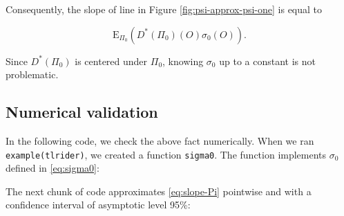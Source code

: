 \documentclass[
  11pt,
  openright,twoside]{book}
\newenvironment{Shaded}{\begin{snugshade}}{\end{snugshade}}
\newcommand{\CommentTok}[1]{\textcolor[rgb]{0.56,0.35,0.01}{\textit{#1}}}
\newcommand{\NormalTok}[1]{#1}
\newcommand{\Exp}{\textrm{E}}
\theoremstyle{definition}
\theoremstyle{definition}
\theoremstyle{definition}
\theoremstyle{definition}
\theoremstyle{remark}
\begin{document}
Consequently, the slope of line in Figure \ref{fig:psi-approx-psi-one} is
equal to

\begin{equation}
\Exp_{\Pi_{0}} (D^{*}(\Pi_{0}) (O) \sigma_{0}(O)). \label{eq:slope-Pi}
\end{equation}

Since \(D^{*}(\Pi_{0})\) is centered under \(\Pi_{0}\), knowing \(\sigma_{0}\) up
to a constant is not problematic.

\hypertarget{numerical-validation}{%
\subsection{Numerical validation}\label{numerical-validation}}

In the following code, we check the above fact numerically. When we ran
\texttt{example(tlrider)}, we created a function \texttt{sigma0}. The function implements
\(\sigma_{0}\) defined in \eqref{eq:sigma0}:

\begin{Shaded}
\end{Shaded}

The next chunk of code approximates
\eqref{eq:slope-Pi} pointwise and with a confidence interval of asymptotic
level 95\%:
\end{document}
